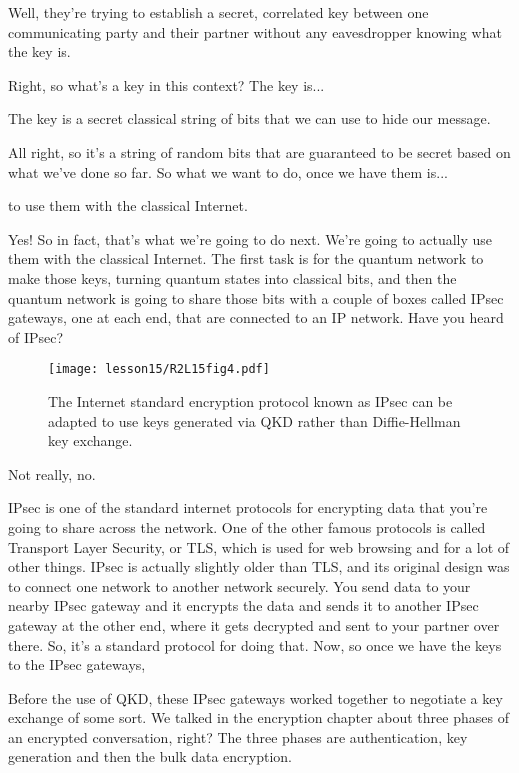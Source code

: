 \mmm Well, they're trying to establish a secret, correlated key between one communicating party and their partner without any eavesdropper knowing what the key is.

\rrr Right, so what's a key in this context? The key is...

\mmm The key is a secret classical string of bits that we can use to hide our message.

\rrr All right, so it's a string of random bits that are guaranteed to be secret based on what we've done so far. So what we want to do, once we have them is...

\mmm to use them with the classical Internet.

\rrr Yes! So in fact, that's what we're going to do next. We're going to actually use them with the classical Internet. The first task is for the quantum network to make those keys, turning quantum states into classical bits, and then the quantum network is going to share those bits with a couple of boxes called IPsec gateways, one at each end, that are connected to an IP network. Have you heard of IPsec?

\begin{figure}[t]
    \centering
    \texttt{[image: lesson15/R2L15fig4.pdf]}
    \caption[IPsec with QKD]{The Internet standard encryption protocol known as IPsec can be adapted to use keys generated via QKD rather than Diffie-Hellman key exchange.}
    \label{fig:15-4-ipsec-with-qkd}
\end{figure}

\mmm Not really, no.

\rrr IPsec is one of the standard internet protocols for encrypting data that you're going to share across the network. One of the other famous protocols is called Transport Layer Security, or TLS, which is used for web browsing and for a lot of other things. IPsec is actually slightly older than TLS, and its original design was to connect one network to another network securely. You send data to your nearby IPsec gateway and it encrypts the data and sends it to another IPsec gateway at the other end, where it gets decrypted and sent to your partner over there. So, it's a standard protocol for doing that. Now, so once we have the keys to the IPsec gateways,

Before the use of QKD, these IPsec gateways worked together to negotiate a key exchange of some sort. We talked in the encryption chapter about three phases of an encrypted conversation, right? The three phases are authentication, key generation and then the bulk data encryption.

